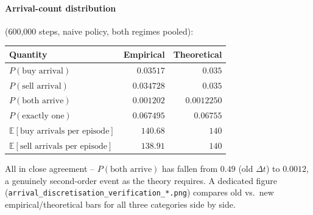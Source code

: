 \documentclass[11pt]{article}
\newcommand{\E}{\mathbb{E}}
\begin{document}
\paragraph{Arrival-count distribution} (600,000 steps, naive policy, both regimes pooled):
\begin{center}
\begin{tabular}{@{}lrr@{}}
\toprule
Quantity & Empirical & Theoretical \\
\midrule
$P(\text{buy arrival})$ & $0.03517$ & $0.035$ \\
$P(\text{sell arrival})$ & $0.034728$ & $0.035$ \\
$P(\text{both arrive})$ & $0.001202$ & $0.0012250$ \\
$P(\text{exactly one})$ & $0.067495$ & $0.06755$ \\
$\E[\text{buy arrivals per episode}]$ & $140.68$ & $140$ \\
$\E[\text{sell arrivals per episode}]$ & $138.91$ & $140$ \\
\bottomrule
\end{tabular}
\end{center}
All in close agreement -- $P(\text{both arrive})$ has fallen from $0.49$ (old $\Delta t$) to $0.0012$, a genuinely second-order event as the theory requires. A dedicated figure (\texttt{arrival\_discretisation\_verification\_*.png}) compares old vs.\ new empirical/theoretical bars for all three categories side by side.
\end{document}
